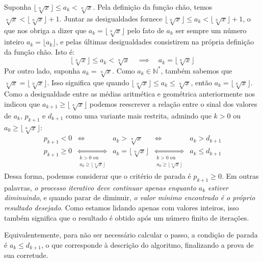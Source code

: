 Suponha $\lfloor \sqrt[n]{x} \rfloor \le a_k < \sqrt[n]{x}$.
Pela definição da função chão, temos
$\sqrt[n]{x} < \lfloor\sqrt[n]{x}\rfloor + 1$.
Juntar as desigualdades fornece
$\lfloor\sqrt[n]{x}\rfloor \le a_k < \lfloor\sqrt[n]{x}\rfloor + 1$,
o que nos obriga a dizer que $a_k = \lfloor\sqrt[n]{x}\rfloor$
pelo fato de $a_k$ ser sempre um número inteiro
$a_k = \lfloor a_k \rfloor$,
e pelas últimas desigualdades consistirem
na própria definição da função chão.
Isto é:
\begin{equation}\label{ak-between-floor-and-root}
  \lfloor \sqrt[n]{x} \rfloor \le a_k < \sqrt[n]{x}
  \quad\implies\quad
  a_k = \lfloor \sqrt[n]{x} \rfloor
\end{equation}
Por outro lado, suponha $a_k = \sqrt[n]{x}$.
Como $a_k \in \mathds{N}^*$,
também sabemos que $\sqrt[n]{x} = \lfloor \sqrt[n]{x} \rfloor$.
Isso significa que
quando $\lfloor \sqrt[n]{x} \rfloor \le a_k \le \sqrt[n]{x}$,
então $a_k = \lfloor \sqrt[n]{x} \rfloor$.
Como a desigualdade entre as médias aritmética e geométrica
anteriormente nos indicou que
$a_{k+1} \ge \lfloor \sqrt[n]{x} \rfloor$
podemos reescrever
a relação entre o sinal dos valores de $a_k$, $p_{k+1}$ e $d_{k+1}$
como uma variante mais restrita,
admindo que $k > 0$ ou $a_0 \ge \lfloor \sqrt[n]{x} \rfloor$:
\[
  \begin{array}{lcccr}
      p_{k+1} < 0
    &\iff&
      a_k > \sqrt[n]{x}
    &\iff&
      a_k > d_{k+1}
    \\
      p_{k+1} \ge 0
    &\underset{\substack{k > 0 \text{ ou} \\[.2em]
                         a_0 \ge \lfloor \sqrt[n]{x} \rfloor}}{\iff}&
      a_k = \lfloor \sqrt[n]{x} \rfloor
    &\underset{\substack{k > 0 \text{ ou} \\[.2em]
                         a_0 \ge \lfloor \sqrt[n]{x} \rfloor}}{\iff}&
      a_k \le d_{k+1}
  \end{array}
\]
Dessa forma,
podemos considerar que o critério de parada é $p_{k+1} \ge 0$.
Em outras palavras,
\emph{o processo iterativo deve continuar
      apenas enquanto $a_k$ estiver diminuindo},
e quando parar de diminuir,
\emph{o valor mínimo encontrado é o próprio resultado desejado}.
Como estamos lidando apenas com valores inteiros,
isso também significa que o resultado é obtido
após um número finito de iterações.

Equivalentemente, para não ser necessário calcular o passo,
a condição de parada é $a_k \le d_{k+1}$,
o que corresponde à descrição do algoritmo,
finalizando a prova de sua corretude.
